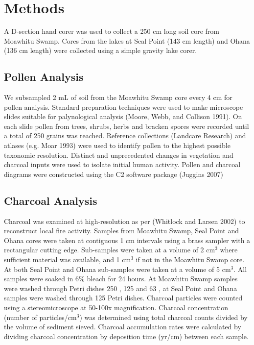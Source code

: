 \section{Methods}\label{methods}

A D-section hand corer was used to collect a 250 cm long soil core from
Moawhitu Swamp. Cores from the lakes at Seal Point (143 cm length) and
Ohana (136 cm length) were collected using a simple gravity lake corer.

\subsection{Pollen Analysis}\label{pollen-analysis}

We subsampled 2 mL of soil from the Moawhitu Swamp core every 4 cm for
pollen analysis. Standard preparation techniques were used to make
microscope slides suitable for palynological analysis (Moore, Webb, and
Collison 1991). On each slide pollen from trees, shrubs, herbs and
bracken spores were recorded until a total of 250 grains was reached.
Reference collections (Landcare Research) and atlases (e.g. Moar 1993)
were used to identify pollen to the highest possible taxonomic
resolution. Distinct and unprecedented changes in vegetation and
charcoal inputs were used to isolate initial human activity. Pollen and
charcoal diagrams were constructed using the C2 software package
(Juggins 2007)

\subsection{Charcoal Analysis}\label{charcoal-analysis}

Charcoal was examined at high-resolution as per (Whitlock and Larsen
2002) to reconstruct local fire activity. Samples from Moawhitu Swamp,
Seal Point and Ohana cores were taken at contiguous 1 cm intervals using
a brass sampler with a rectangular cutting edge. Sub-samples were taken
at a volume of 2 cm\(^{3}\) where sufficient material was available, and
1 cm\(^{3}\) if not in the Moawhitu Swamp core. At both Seal Point and
Ohana sub-samples were taken at a volume of 5 cm\(^{3}\). All samples
were soaked in 6\% bleach for 24 hours. At Moawhitu Swamp samples were
washed through Petri dishes 250 , 125 and 63 , at Seal Point and Ohana
samples were washed through 125 Petri dishes. Charcoal particles were
counted using a stereomicroscope at 50-100x magnification. Charcoal
concentration (number of particles/cm\(^{3}\)) was determined using
total charcoal counts divided by the volume of sediment sieved. Charcoal
accumulation rates were calculated by dividing charcoal concentration by
deposition time (yr/cm) between each sample.

